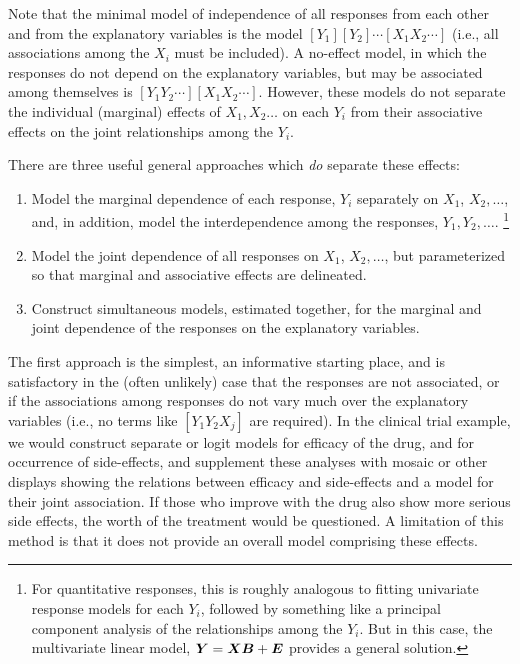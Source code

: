 \documentclass[11pt]{book}\usepackage[]{graphicx}\usepackage[]{color}
\begin{document}
Note that the minimal model of independence of all responses from each other
and from the explanatory variables is the \loglin model
$[Y_1] [Y_2] \cdots [X_1 X_2 \cdots]$
(i.e., all associations among the $X_i$ must be included).
A no-effect model, in which the responses do not depend on the
explanatory variables, but may be associated among themselves is
$[Y_1 Y_2 \cdots] [X_1 X_2 \cdots]$.  However,  these models do not separate
the individual
(marginal) effects of $X_1, X_2 \dots$ on each $Y_i$ from their associative effects
on the joint relationships among the $Y_i$.

There are three useful general approaches which \emph{do} separate these effects:
\begin{enumerate}
\item Model the marginal dependence of each response, $Y_i$ separately on $X_1$, $X_2, \dots$,
and, in addition, model the interdependence among the responses,
$Y_1, Y_2, \dots$.%
\footnote{
For quantitative responses, this is roughly analogous to fitting
univariate response models for each $Y_i$, followed by something like
a principal component analysis of the relationships among the $Y_i$.
But in this case, the multivariate linear model,
$\bm{Y} = \bm{X} \bm{B} + \bm{E}$ provides a general solution.
}
\item Model the joint dependence of all responses on $X_1$, $X_2, \dots$,
but parameterized so that marginal and associative effects are delineated.
\item Construct simultaneous models, estimated together, for the
marginal and joint dependence of the responses on the explanatory variables.
\end{enumerate}

The first approach is the simplest, an informative starting place,
and is satisfactory in the (often unlikely) case that the responses
are not associated, or if the associations among responses do not vary much
over the explanatory variables (i.e., no terms like $[Y_1 Y_2 X_j]$ are
required).  In the clinical trial example, we would construct separate
\loglin or logit models for efficacy of the drug, and for occurrence
of side-effects, and supplement these analyses with mosaic or other
displays showing the relations between efficacy and side-effects
and a model for their joint association. If those who improve
with the drug also show more serious side effects, the worth of the
treatment would be questioned.
A limitation of this method is that it does not provide an overall
model comprising these effects.
\end{document}

